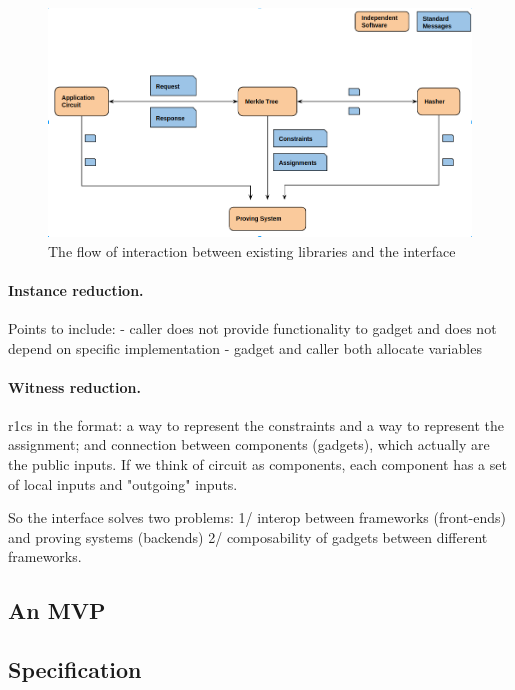 			\begin{figure}[h!]
				\includegraphics[width=\linewidth]{routine.png}
				\caption{The flow of interaction between existing libraries and the interface}
				\label{flow}
			\end{figure}

		\paragraph{Instance reduction.} 
		
        Points to include:
        - caller does not provide functionality to gadget and does not depend on specific implementation
        - gadget and caller both allocate variables
		
		\paragraph{Witness reduction.}
		
		r1cs in the format: a way to represent the constraints and a way to represent the assignment; and connection between components (gadgets), which actually are the public inputs. If we think of circuit as components, each component has a set of local inputs and "outgoing" inputs.
		
		So the interface solves two problems: 1/ interop between frameworks (front-ends) and proving systems (backends) 2/ composability of gadgets between different frameworks.
		
	
		
		\subsection{An MVP}
		
		
		
		\subsection{Specification}
        
